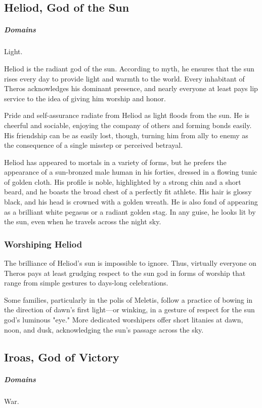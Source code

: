 \subsection*{Heliod, God of the Sun} \label{ssec::heliod}
    \subparagraph{Domains} Light.

    Heliod is the radiant god of the sun. According to myth, he ensures that the sun rises every day to provide light and warmth to the world. Every inhabitant of Theros acknowledges his dominant presence, and nearly everyone at least pays lip service to the idea of giving him worship and honor.

    Pride and self-assurance radiate from Heliod as light floods from the sun. He is cheerful and sociable, enjoying the company of others and forming bonds easily. His friendship can be as easily lost, though, turning him from ally to enemy as the consequence of a single misstep or perceived betrayal.

    Heliod has appeared to mortals in a variety of forms, but he prefers the appearance of a sun-bronzed male human in his forties, dressed in a flowing tunic of golden cloth. His profile is noble, highlighted by a strong chin and a short beard, and he boasts the broad chest of a perfectly fit athlete. His hair is glossy black, and his head is crowned with a golden wreath. He is also fond of appearing as a brilliant white pegasus or a radiant golden stag. In any guise, he looks lit by the sun, even when he travels across the night sky.

    \subsubsection{Worshiping Heliod}
        The brilliance of Heliod's sun is impossible to ignore. Thus, virtually everyone on Theros pays at least grudging respect to the sun god in forms of worship that range from simple gestures to days-long celebrations.

        Some families, particularly in the polis of Meletis, follow a practice of bowing in the direction of dawn's first light—or winking, in a gesture of respect for the sun god's luminous "eye." More dedicated worshipers offer short litanies at dawn, noon, and dusk, acknowledging the sun's passage across the sky.

\subsection*{Iroas, God of Victory} \label{ssec::iroas}
    \subparagraph{Domains} War.

